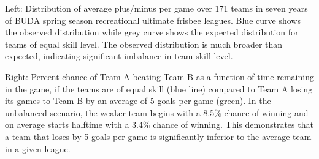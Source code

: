 Left: Distribution of average plus/minus per game over 171 teams in seven years of BUDA spring season recreational ultimate frisbee leagues.  Blue curve shows the observed distribution while grey curve shows the expected distribution for teams of equal skill level. The observed distribution is much broader than expected, indicating significant imbalance in team skill level. 

Right: Percent chance of Team A beating Team B as a function of time remaining in the game, if the teams are of equal skill (blue line) compared to Team A losing its games to Team B by an average of 5 goals per game (green). In the unbalanced scenario, the weaker team begins with a 8.5\% chance of winning and on average starts halftime with a 3.4\% chance of winning. This demonstrates that a team that loses by 5 goals per game is significantly inferior to the average team in a given league. \label{fig:buda_performance}